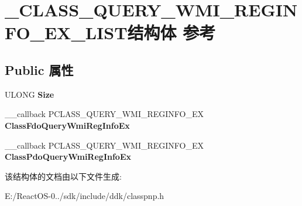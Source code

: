 \hypertarget{struct___c_l_a_s_s___q_u_e_r_y___w_m_i___r_e_g_i_n_f_o___e_x___l_i_s_t}{}\section{\+\_\+\+C\+L\+A\+S\+S\+\_\+\+Q\+U\+E\+R\+Y\+\_\+\+W\+M\+I\+\_\+\+R\+E\+G\+I\+N\+F\+O\+\_\+\+E\+X\+\_\+\+L\+I\+S\+T结构体 参考}
\label{struct___c_l_a_s_s___q_u_e_r_y___w_m_i___r_e_g_i_n_f_o___e_x___l_i_s_t}
\subsection*{Public 属性}
\begin{DoxyCompactItemize}
\item 
\mbox{\label{struct___c_l_a_s_s___q_u_e_r_y___w_m_i___r_e_g_i_n_f_o___e_x___l_i_s_t_a194e6cc7cbc76d1e3ce091f42c395e47}} 
U\+L\+O\+NG {\bfseries Size}
\item 
\mbox{\label{struct___c_l_a_s_s___q_u_e_r_y___w_m_i___r_e_g_i_n_f_o___e_x___l_i_s_t_ae13e9138ddec8a5d655062e7a3b6c847}} 
\+\_\+\+\_\+callback P\+C\+L\+A\+S\+S\+\_\+\+Q\+U\+E\+R\+Y\+\_\+\+W\+M\+I\+\_\+\+R\+E\+G\+I\+N\+F\+O\+\_\+\+EX {\bfseries Class\+Fdo\+Query\+Wmi\+Reg\+Info\+Ex}
\item 
\mbox{\label{struct___c_l_a_s_s___q_u_e_r_y___w_m_i___r_e_g_i_n_f_o___e_x___l_i_s_t_ab69ef7d2b6965bc49ba6b9a13483b45a}} 
\+\_\+\+\_\+callback P\+C\+L\+A\+S\+S\+\_\+\+Q\+U\+E\+R\+Y\+\_\+\+W\+M\+I\+\_\+\+R\+E\+G\+I\+N\+F\+O\+\_\+\+EX {\bfseries Class\+Pdo\+Query\+Wmi\+Reg\+Info\+Ex}
\end{DoxyCompactItemize}


该结构体的文档由以下文件生成\+:\begin{DoxyCompactItemize}
\item 
E\+:/\+React\+O\+S-\/0../sdk/include/ddk/classpnp.\+h\end{DoxyCompactItemize}
